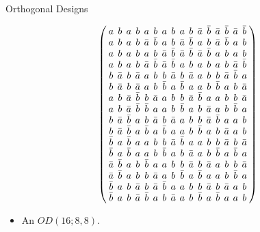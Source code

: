 \documentclass{beamer}
\begin{document}
\begin{frame}{Orthogonal Designs}

  \[
    \arraycolsep=2.0pt\def\arraystretch{0.75}
    \left(
      \begin{array}{cccccccccccccccc}
        a&b&a&b&a&b&a&b&a&b&\bar{a}&\bar{b}&\bar{a}&\bar{b}&\bar{a}&\bar{b}\\
        a&b&a&b&\bar{a}&\bar{b}&a&b&\bar{a}&\bar{b}&a&b&\bar{a}&\bar{b}&a&b\\
        a&b&a&b&a&b&\bar{a}&\bar{b}&\bar{a}&\bar{b}&\bar{a}&\bar{b}&a&b&a&b\\
        a&b&a&b&\bar{a}&\bar{b}&\bar{a}&\bar{b}&a&b&a&b&a&b&\bar{a}&\bar{b}\\
        b&\bar{a}&b&\bar{a}&a&b&b&\bar{a}&b&\bar{a}&a&b&b&\bar{a}&\bar{b}&a\\
        b&\bar{a}&b&\bar{a}&a&b&\bar{b}&a&\bar{b}&a&a&b&\bar{b}&a&b&\bar{a}\\
        a&b&\bar{a}&\bar{b}&b&\bar{a}&a&b&b&\bar{a}&\bar{b}&a&a&b&b&\bar{a}\\
        a&b&\bar{a}&\bar{b}&\bar{b}&a&a&b&\bar{b}&a&b&\bar{a}&a&b&\bar{b}&a\\
        b&\bar{a}&\bar{b}&a&b&\bar{a}&b&\bar{a}&a&b&b&\bar{a}&\bar{b}&a&a&b\\
        b&\bar{a}&\bar{b}&a&\bar{b}&a&\bar{b}&a&a&b&\bar{b}&a&b&\bar{a}&a&b\\
        \bar{b}&a&\bar{b}&a&a&b&b&\bar{a}&\bar{b}&a&a&b&b&\bar{a}&b&\bar{a}\\
        \bar{b}&a&\bar{b}&a&a&b&\bar{b}&a&b&\bar{a}&a&b&\bar{b}&a&\bar{b}&a\\
        \bar{a}&\bar{b}&a&b&\bar{b}&a&a&b&b&\bar{a}&b&\bar{a}&a&b&b&\bar{a}\\
        \bar{a}&\bar{b}&a&b&b&\bar{a}&a&b&\bar{b}&a&\bar{b}&a&a&b&\bar{b}&a\\
        \bar{b}&a&b&\bar{a}&b&\bar{a}&\bar{b}&a&a&b&b&\bar{a}&b&\bar{a}&a&b\\
        \bar{b}&a&b&\bar{a}&\bar{b}&a&b&\bar{a}&a&b&\bar{b}&a&\bar{b}&a&a&b\\
      \end{array}
    \right)
  \]

  \begin{itemize}
    \item An $OD(16;8,8)$.
  \end{itemize}
  
\end{frame}
\end{document}
